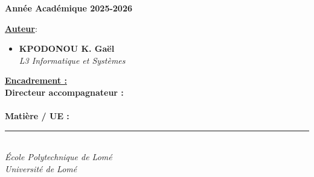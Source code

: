 \documentclass[12pt,a4paper]{article}
\begin{document}
\begin{titlepage}
\begin{center}
\vspace{1cm}
{\Large \textbf{Année Académique 2025-2026}}
\end{center}

\vspace{1.5cm}

\noindent
\begin{minipage}{0.48\textwidth}
    \begin{flushleft}
        \large \textbf{\underline{Auteur}}: \\[0.4cm]
        \begin{itemize}[leftmargin=*, itemsep=0.2cm]
            \item[\textcolor{accentgold}{\large$\bullet$}] \textbf{KPODONOU K. Gaël} \\
            \textit{L3 Informatique et Systèmes} \\
        \end{itemize}
    \end{flushleft}
\end{minipage}
\hfill
\begin{minipage}{0.48\textwidth}
    \begin{flushright}
        \large \textbf{\underline{Encadrement :}} \\[0.4cm]
        \textbf{Directeur accompagnateur :} \\[0.2cm]
        \makebox[5cm]{\dotfill} \\[0.3cm]
        \textbf{Matière / UE :} \\[0.2cm]
        \makebox[5cm]{\dotfill}
    \end{flushright}
\end{minipage}

\vspace{1cm}
\begin{center}
    \textcolor{gray}{\rule{0.8\textwidth}{0.5pt}} \\[0.2cm]
    \small\textit{École Polytechnique de Lomé} \\
    \small\textit{Université de Lomé}
\end{center}
\end{titlepage}


\restoregeometry
\pagestyle{synthstyle}
\setcounter{page}{1}   %
\end{document}
